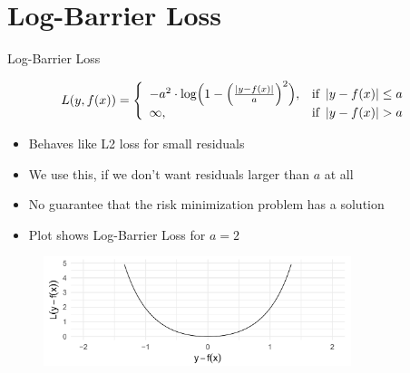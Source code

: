 \section{Log-Barrier Loss}

\begin{vbframe}{Log-Barrier Loss}

\begin{footnotesize}
\[
  L(y, f(x)) = \left\{\begin{array}{lr}
        -a^{2} \cdot \log \Bigl( 1 - \Bigl(\frac{\left|y - f(x)\right|}{a}\Bigr)^2 \Bigr), & \text{if } \left|y-f(x)\right| \leq a \\
        \infty, & \text{if } \left|y-f(x)\right|  > a
        \end{array}\right.
  \]
\end{footnotesize}
\begin{itemize}
\item Behaves like L2 loss for small residuals
\item We use this, if we don't want residuals larger than $a$ at all
\item No guarantee that the risk minimization problem has a solution
\item Plot shows Log-Barrier Loss for $a=2$
\end{itemize}

\begin{figure}
\includegraphics[width = 0.8\textwidth]{figure_man/log-barrier01.png}
\end{figure}


\end{vbframe}



